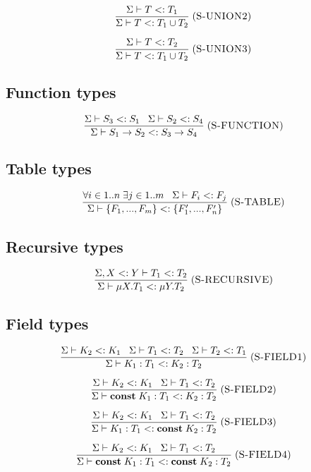 \documentclass[12pt]{article}
\newcommand{\Const}{\mathbf{const}}
\newcommand{\mylabel}[1]{\; (\textsc{#1})}
\newcommand{\subtype}{<:}
\newcommand{\senv}{\Sigma}
\begin{document}
\[
\frac{\senv \vdash T \subtype T_{1}}
     {\senv \vdash T \subtype T_{1} \cup T_{2}}
\mylabel{S-UNION2}
\]

\[
\frac{\senv \vdash T \subtype T_{2}}
     {\senv \vdash T \subtype T_{1} \cup T_{2}}
\mylabel{S-UNION3}
\]

\subsection{Function types}

\[
\frac{\senv \vdash S_{3} \subtype S_{1} \;\;\;
      \senv \vdash S_{2} \subtype S_{4}}
     {\senv \vdash S_{1} \rightarrow S_{2} \subtype S_{3} \rightarrow S_{4}}
\mylabel{S-FUNCTION}
\]

\subsection{Table types}

\[
\frac{\forall i \in 1..n \; \exists j \in 1..m \;\;\;
      \senv \vdash F_{i} \subtype F_{j}}
     {\senv \vdash \{F_{1}, ..., F_{m}\} \subtype \{F_{1}', ..., F_{n}'\}}
\mylabel{S-TABLE}
\]

\subsection{Recursive types}

\[
\frac{\senv, X \subtype Y \vdash T_{1} \subtype T_{2}}
     {\senv \vdash \mu X.T_{1} \subtype \mu Y.T_{2}}
\mylabel{S-RECURSIVE}
\]

\subsection{Field types}

\[
\frac{\senv \vdash K_{2} \subtype K_{1} \;\;\;
      \senv \vdash T_{1} \subtype T_{2} \;\;\;
      \senv \vdash T_{2} \subtype T_{1}}
     {\senv \vdash K_{1}:T_{1} \subtype K_{2}:T_{2}}
\mylabel{S-FIELD1}
\]

\[
\frac{\senv \vdash K_{2} \subtype K_{1} \;\;\;
      \senv \vdash T_{1} \subtype T_{2}}
     {\senv \vdash \Const \; K_{1}:T_{1} \subtype K_{2}:T_{2}}
\mylabel{S-FIELD2}
\]

\[
\frac{\senv \vdash K_{2} \subtype K_{1} \;\;\;
      \senv \vdash T_{1} \subtype T_{2}}
     {\senv \vdash K_{1}:T_{1} \subtype \Const \; K_{2}:T_{2}}
\mylabel{S-FIELD3}
\]

\[
\frac{\senv \vdash K_{2} \subtype K_{1} \;\;\;
      \senv \vdash T_{1} \subtype T_{2}}
     {\senv \vdash \Const \; K_{1}:T_{1} \subtype \Const \; K_{2}:T_{2}}
\mylabel{S-FIELD4}
\]
\end{document}
